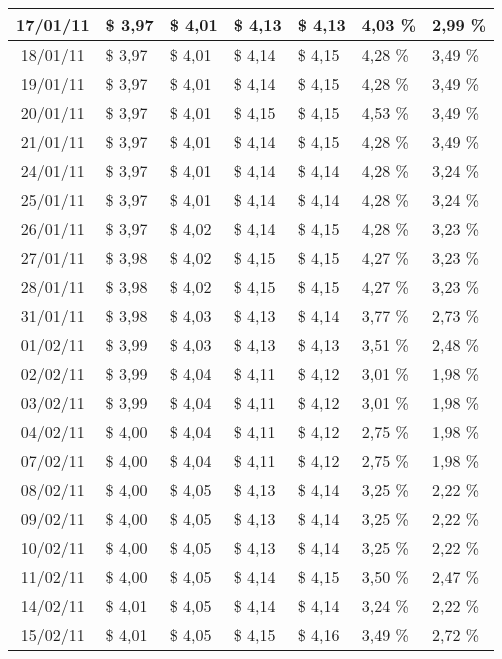 \begin{center}
\begin{longtable}{|c|p{1.5cm}|p{1.5cm}|p{1.5cm}|p{1.5cm}|p{1.5cm}|p{1.5cm}|}
17/01/11 & \$ 3,97 & \$ 4,01 & \$ 4,13 & \$ 4,13 & 4,03 \% & 2,99 \% \\ \hline
18/01/11 & \$ 3,97 & \$ 4,01 & \$ 4,14 & \$ 4,15 & 4,28 \% & 3,49 \% \\ \hline
19/01/11 & \$ 3,97 & \$ 4,01 & \$ 4,14 & \$ 4,15 & 4,28 \% & 3,49 \% \\ \hline
20/01/11 & \$ 3,97 & \$ 4,01 & \$ 4,15 & \$ 4,15 & 4,53 \% & 3,49 \% \\ \hline
21/01/11 & \$ 3,97 & \$ 4,01 & \$ 4,14 & \$ 4,15 & 4,28 \% & 3,49 \% \\ \hline
24/01/11 & \$ 3,97 & \$ 4,01 & \$ 4,14 & \$ 4,14 & 4,28 \% & 3,24 \% \\ \hline
25/01/11 & \$ 3,97 & \$ 4,01 & \$ 4,14 & \$ 4,14 & 4,28 \% & 3,24 \% \\ \hline
26/01/11 & \$ 3,97 & \$ 4,02 & \$ 4,14 & \$ 4,15 & 4,28 \% & 3,23 \% \\ \hline
27/01/11 & \$ 3,98 & \$ 4,02 & \$ 4,15 & \$ 4,15 & 4,27 \% & 3,23 \% \\ \hline
28/01/11 & \$ 3,98 & \$ 4,02 & \$ 4,15 & \$ 4,15 & 4,27 \% & 3,23 \% \\ \hline
31/01/11 & \$ 3,98 & \$ 4,03 & \$ 4,13 & \$ 4,14 & 3,77 \% & 2,73 \% \\ \hline
01/02/11 & \$ 3,99 & \$ 4,03 & \$ 4,13 & \$ 4,13 & 3,51 \% & 2,48 \% \\ \hline
02/02/11 & \$ 3,99 & \$ 4,04 & \$ 4,11 & \$ 4,12 & 3,01 \% & 1,98 \% \\ \hline
03/02/11 & \$ 3,99 & \$ 4,04 & \$ 4,11 & \$ 4,12 & 3,01 \% & 1,98 \% \\ \hline
04/02/11 & \$ 4,00 & \$ 4,04 & \$ 4,11 & \$ 4,12 & 2,75 \% & 1,98 \% \\ \hline
07/02/11 & \$ 4,00 & \$ 4,04 & \$ 4,11 & \$ 4,12 & 2,75 \% & 1,98 \% \\ \hline
08/02/11 & \$ 4,00 & \$ 4,05 & \$ 4,13 & \$ 4,14 & 3,25 \% & 2,22 \% \\ \hline
09/02/11 & \$ 4,00 & \$ 4,05 & \$ 4,13 & \$ 4,14 & 3,25 \% & 2,22 \% \\ \hline
10/02/11 & \$ 4,00 & \$ 4,05 & \$ 4,13 & \$ 4,14 & 3,25 \% & 2,22 \% \\ \hline
11/02/11 & \$ 4,00 & \$ 4,05 & \$ 4,14 & \$ 4,15 & 3,50 \% & 2,47 \% \\ \hline
14/02/11 & \$ 4,01 & \$ 4,05 & \$ 4,14 & \$ 4,14 & 3,24 \% & 2,22 \% \\ \hline
15/02/11 & \$ 4,01 & \$ 4,05 & \$ 4,15 & \$ 4,16 & 3,49 \% & 2,72 \% \\ \hline

\end{longtable}
\end{center}
